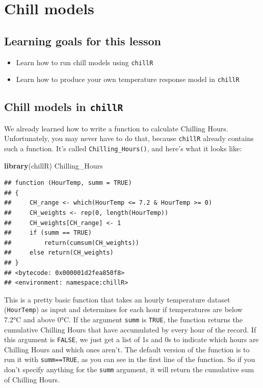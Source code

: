 \documentclass[
]{book}
\newenvironment{Shaded}{\begin{snugshade}}{\end{snugshade}}
\newcommand{\KeywordTok}[1]{\textcolor[rgb]{0.13,0.29,0.53}{\textbf{#1}}}
\newcommand{\NormalTok}[1]{#1}
\providecommand{\tightlist}{%
  \setlength{\itemsep}{0pt}\setlength{\parskip}{0pt}}
\begin{document}
\hypertarget{chill-models}{%
\chapter{Chill models}\label{chill-models}}

\hypertarget{goals_chill_models}{%
\section*{Learning goals for this lesson}\label{goals_chill_models}}

\begin{itemize}
\tightlist
\item
  Learn how to run chill models using \texttt{chillR}
\item
  Learn how to produce your own temperature response model in \texttt{chillR}
\end{itemize}

\hypertarget{chill-models-in-chillr}{%
\section{\texorpdfstring{Chill models in \texttt{chillR}}{Chill models in chillR}}\label{chill-models-in-chillr}}

We already learned how to write a function to calculate Chilling Hours. Unfortunately, you may never have to do that, because \texttt{chillR} already contains such a function. It's called \texttt{Chilling\_Hours()}, and here's what it looks like:

\begin{Shaded}
\begin{Highlighting}[]
\KeywordTok{library}\NormalTok{(chillR)}
\NormalTok{Chilling_Hours}
\end{Highlighting}
\end{Shaded}

\begin{verbatim}
## function (HourTemp, summ = TRUE) 
## {
##     CH_range <- which(HourTemp <= 7.2 & HourTemp >= 0)
##     CH_weights <- rep(0, length(HourTemp))
##     CH_weights[CH_range] <- 1
##     if (summ == TRUE) 
##         return(cumsum(CH_weights))
##     else return(CH_weights)
## }
## <bytecode: 0x000001d2fea850f8>
## <environment: namespace:chillR>
\end{verbatim}

This is a pretty basic function that takes an hourly temperature dataset (\texttt{HourTemp}) as input and determines for each hour if temperatures are below 7.2°C and above 0°C. If the argument \texttt{summ} is \texttt{TRUE}, the function returns the cumulative Chilling Hours that have accumulated by every hour of the record. If this argument is \texttt{FALSE}, we just get a list of 1s and 0s to indicate which hours are Chilling Hours and which ones aren't. The default version of the function is to run it with \texttt{summ==TRUE}, as you can see in the first line of the function. So if you don't specify anything for the \texttt{summ} argument, it will return the cumulative sum of Chilling Hours.
\end{document}

